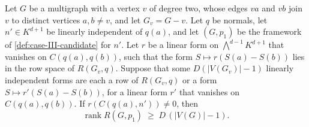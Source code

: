 \begin{lemma}
  \label{lem:case-III-rank-certification}
  \leanok
  Let $G$ be a multigraph with a vertex $v$ of degree two, whose edges
  $va$ and $vb$ join $v$ to distinct vertices $a, b \neq v$, and let
  $G_v = G - v$. Let $q$ be normals, let $n' \in K^{d+1}$ be linearly
  independent of $q(a)$, and let $(G, p_1)$ be the framework of
  \cref{def:case-III-candidate} for $n'$. Let $r$ be a linear form on
  $\bigwedge^{d-1} K^{d+1}$ that vanishes on $C(q(a), q(b))$, such that
  the form $S \mapsto r(S(a) - S(b))$ lies in the row space of
  $R(G_v, q)$. Suppose that some $D(|V(G_v)| - 1)$ linearly independent
  forms are each a row of $R(G_v, q)$ or a form
  $S \mapsto r'(S(a) - S(b))$, for a linear form $r'$ that vanishes on
  $C(q(a), q(b))$. If $r(C(q(a), n')) \neq 0$, then
  \[
    \operatorname{rank} R(G, p_1) \;\ge\; D\,(|V(G)| - 1).
  \]
\end{lemma}
